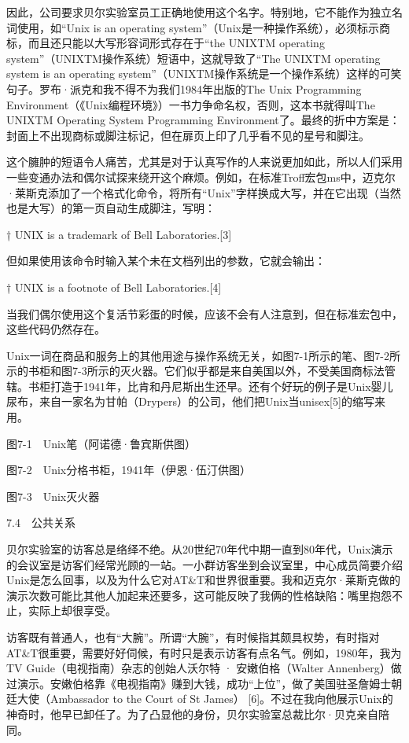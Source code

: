 \documentclass[a4paper,12pt,UTF8,twoside]{ctexbook}
\begin{document}
{{因此，公司要求贝尔实验室员工正确地使用这个名字。特别地，它不能作为独立名词使用，如“Unix is an operating system”（Unix是一种操作系统），必须标示商标，而且还只能以大写形容词形式存在于“the UNIXTM operating system”（UNIXTM操作系统）短语中，这就导致了“The UNIXTM operating system is an operating system”（UNIXTM操作系统是一个操作系统）这样的可笑句子。罗布·派克和我不得不为我们1984年出版的The Unix Programming Environment（《Unix编程环境》）一书力争命名权，否则，这本书就得叫The UNIXTM Operating System Programming Environment了。最终的折中方案是：封面上不出现商标或脚注标记，但在扉页上印了几乎看不见的星号和脚注。

这个臃肿的短语令人痛苦，尤其是对于认真写作的人来说更加如此，所以人们采用一些变通办法和偶尔试探来绕开这个麻烦。例如，在标准Troff宏包ms中，迈克尔·莱斯克添加了一个格式化命令，将所有“Unix”字样换成大写，并在它出现（当然也是大写）的第一页自动生成脚注，写明：

† UNIX is a trademark of Bell Laboratories.[3]

但如果使用该命令时输入某个未在文档列出的参数，它就会输出：

† UNIX is a footnote of Bell Laboratories.[4]

当我们偶尔使用这个复活节彩蛋的时候，应该不会有人注意到，但在标准宏包中，这些代码仍然存在。

Unix一词在商品和服务上的其他用途与操作系统无关，如图7-1所示的笔、图7-2所示的书柜和图7-3所示的灭火器。它们似乎都是来自美国以外，不受美国商标法管辖。书柜打造于1941年，比肯和丹尼斯出生还早。还有个好玩的例子是Unix婴儿尿布，来自一家名为甘帕（Drypers）的公司，他们把Unix当unisex[5]的缩写来用。



图7-1　Unix笔（阿诺德·鲁宾斯供图）



图7-2　Unix分格书柜，1941年（伊恩·伍汀供图）



图7-3　Unix灭火器





7.4　公共关系


贝尔实验室的访客总是络绎不绝。从20世纪70年代中期一直到80年代，Unix演示的会议室是访客们经常光顾的一站。一小群访客坐到会议室里，中心成员简要介绍Unix是怎么回事，以及为什么它对AT\&T和世界很重要。我和迈克尔·莱斯克做的演示次数可能比其他人加起来还要多，这可能反映了我俩的性格缺陷：嘴里抱怨不止，实际上却很享受。

访客既有普通人，也有“大腕”。所谓“大腕”，有时候指其颇具权势，有时指对AT\&T很重要，需要好好伺候，有时只是表示访客有点名气。例如，1980年，我为TV Guide（电视指南）杂志的创始人沃尔特 · 安嫩伯格（Walter Annenberg）做过演示。安嫩伯格靠《电视指南》赚到大钱，成功“上位”，做了美国驻圣詹姆士朝廷大使（Ambassador to the Court of St James） [6]。不过在我向他展示Unix的神奇时，他早已卸任了。为了凸显他的身份，贝尔实验室总裁比尔·贝克亲自陪同。

}}
\end{document}
